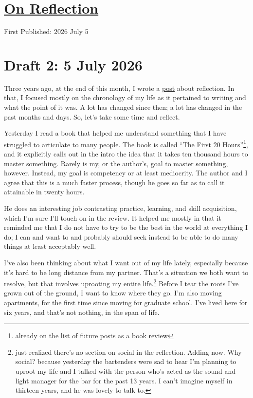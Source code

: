 \documentclass[12pt]{article}
\newcommand{\say}[1]{``#1''}
\renewcommand{\,}{\textsuperscript{,}}
\begin{document}
  
\doublespacing  
\section{\href{reflection-2.html}{On Reflection}}  
First Published: 2026 July 5

\section{Draft 2: 5 July 2026}

Three years ago, at the end of this month, I wrote a \href{reflection}{post} about reflection.  
In that, I focused mostly on the chronology of my life as it pertained to writing and what the point of it was.  
A lot has changed since then; a lot has changed in the past months and days.  
So, let's take some time and reflect.

Yesterday I read a book that helped me understand something that I have struggled to articulate to many people.  
The book is called \say{The First 20 Hours}\footnote{already on the list of future posts as a book review}, and it explicitly calls out in the intro the idea that it takes ten thousand hours to master something.  
Rarely is my, or the author's, goal to master something, however.  
Instead, my goal is competency or at least mediocrity.  
The author and I agree that this is a much faster process, though he goes so far as to call it attainable in twenty hours.

He does an interesting job contrasting practice, learning, and skill acquisition, which I'm sure I'll touch on in the review.  
It helped me mostly in that it reminded me that I do not have to try to be the best in the world at everything I do; I can and want to and probably should seek instead to be able to do many things at least acceptably well.

I've also been thinking about what I want out of my life lately, especially because it's hard to be long distance from my partner.  
That's a situation we both want to resolve, but that involves uprooting my entire life.\footnote{just realized there's no section on social in the reflection. Adding now. Why social? because yesterday the bartenders were sad to hear I'm planning to uproot my life and I talked with the person who's acted as the sound and light manager for the bar for the past 13 years. I can't imagine myself in thirteen years, and he was lovely to talk to.}  
Before I tear the roots I've grown out of the ground, I want to know where they go.  
I'm also moving apartments, for the first time since moving for graduate school.  
I've lived here for six years, and that's not nothing, in the span of life.
\end{document}
